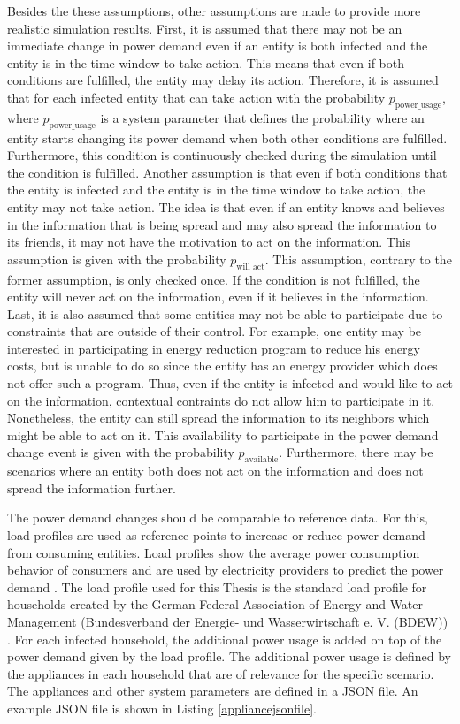 Besides the these assumptions, other assumptions are made 
to provide more realistic simulation results. 
First, it is assumed that there may not be an immediate change 
in power demand even if an entity is both infected and the entity 
is in the time window to take action. This means that even if
both conditions are fulfilled, the entity may delay its action. 
Therefore, it is assumed that for each infected entity that can 
take action with the probability $p_{\mathrm{power\_usage}}$, where 
$p_{\mathrm{power\_usage}}$ is a system
parameter that defines the probability where an entity
starts changing its power demand when both other conditions are
fulfilled. Furthermore, this condition is continuously checked 
during the simulation until the condition is fulfilled.
Another assumption is that even if both conditions that
the entity is infected and the entity is in the time window 
to take action, the entity may not take action.
The idea is that even if an entity knows and believes
in the information that is being spread and may also spread
the information to its friends, it may not have the motivation to 
act on the information.
This assumption is given with the probability $p_{\mathrm{will\_act}}$.
This assumption, contrary to the former assumption, is only
checked once. If the condition is not fulfilled, the 
entity will never act on the information, even if 
it believes in the information. Last, it 
is also assumed that some entities may not be able to participate due 
to constraints that are outside of their control. For example, 
one entity may be interested in participating in energy reduction
program to reduce his energy costs, but is unable to do so since 
the entity has an energy provider which does not offer such a program.
Thus, even if the entity is infected and would like to act on the 
information, contextual contraints do not allow him to participate in it.
Nonetheless, the entity can still spread the information to its neighbors
which might be able to act on it. 
This availability to participate in the power demand change event is 
given with the probability $p_{\mathrm{available}}$.
Furthermore, there may be scenarios where 
an entity both does not act on the information and does not 
spread the information further. 

The power demand changes should be comparable to reference data.
For this, load profiles are used as reference points to increase
or reduce power demand from consuming entities. Load profiles
show the average power consumption behavior of consumers and 
are used by electricity providers to predict the power demand
\cite{proedrou2021comprehensive}.
The load profile used for this Thesis is the standard load profile
for households created by the German Federal Association of Energy and 
Water Management (Bundesverband der Energie- und Wasserwirtschaft 
e. V. (BDEW)) \cite{meier1999reprasentative}.
For each infected household, the additional power usage is 
added on top of the power demand given by the load profile.
The additional power usage is defined by the appliances in each
household that are of relevance for the specific scenario. 
The appliances and other system parameters are defined
in a JSON file. An example JSON file is shown in Listing 
\ref{appliancejsonfile}.

